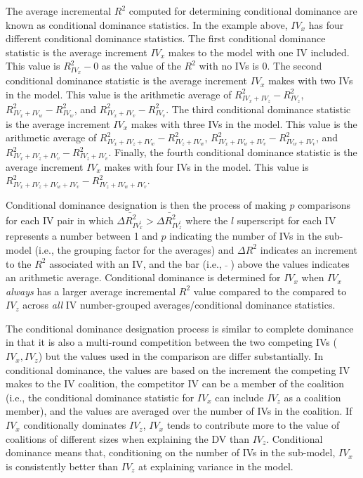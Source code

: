 \documentclass[ShortAfour,times,sageapa]{sagej}
\begin{document}
	The average incremental $R^2$ computed for determining conditional dominance are known as conditional dominance statistics.
	In the example above, $IV_x$ has four different conditional dominance statistics. 
	The first conditional dominance statistic is the average increment $IV_x$ makes to the model with one IV included.
	This value is $R^2_{IV_x} - 0$ as the value of the $R^2$ with no IVs is 0.
	The second conditional dominance statistic is the average increment $IV_x$ makes with two IVs in the model.
	This value is the arithmetic average of $R^2_{IV_x + IV_z} - R^2_{IV_z}$, $R^2_{IV_x + IV_w} - R^2_{IV_w}$, and $R^2_{IV_x + IV_v} - R^2_{IV_v}$.
	The third conditional dominance statistic is the average increment $IV_x$ makes with three IVs in the model.
	This value is the arithmetic average of $R^2_{IV_x + IV_z + IV_w} - R^2_{IV_z + IV_w}$, $R^2_{IV_x + IV_w + IV_v} - R^2_{IV_w + IV_v}$, and $R^2_{IV_x + IV_z + IV_v} - R^2_{IV_z + IV_v}$.
	Finally, the fourth conditional dominance statistic is the average increment $IV_x$ makes with four IVs in the model.
	This value is $R^2_{IV_x + IV_z + IV_w + IV_v} - R^2_{IV_z + IV_w + IV_v}$.
	
	Conditional dominance designation is then the process of making $p$ comparisons for each IV pair in which $\bar{\Delta R^2_{IV^l_x}} > \bar{\Delta R^2_{IV^l_z}}$ where the $l$ superscript for each IV represents a number between 1 and $p$ indicating the number of IVs in the sub-model (i.e., the grouping factor for the averages) and $\Delta R^2$ indicates an increment to the $R^2$ associated with an IV, and the bar (i.e., $\bar{ }$ ) above the values indicates an arithmetic average. 
	Conditional dominance is determined for $IV_x$ when $IV_x$ \emph{always} has a larger average incremental $R^2$ value compared to the compared to $IV_z$ across \emph{all} IV number-grouped averages/conditional dominance statistics.
	
	The conditional dominance designation process is similar to complete dominance in that it is also a multi-round competition between the two competing IVs ($IV_x, IV_z$) but the values used in the comparison are differ substantially.  
	In conditional dominance, the values are based on the increment the competing IV makes to the IV coalition, the competitor IV can be a member of the coalition (i.e., the conditional dominance statistic for $IV_x$ can include $IV_z$ as a coalition member), and the values are averaged over the number of IVs in the coalition.
	If $IV_x$ conditionally dominates $IV_z$, $IV_x$ tends to contribute more to the value of coalitions of different sizes when explaining the DV than $IV_z$.
	Conditional dominance means that, conditioning on the number of IVs in the sub-model, $IV_x$ is consistently better than $IV_z$ at explaining variance in the model.
	
\end{document}
